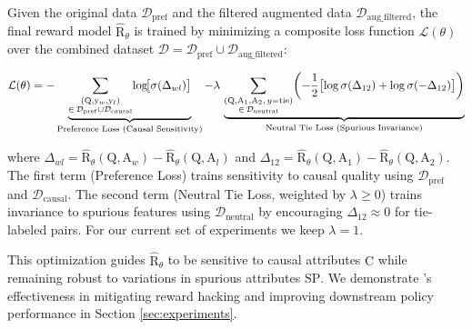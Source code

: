 Given the original data $\mathcal{D}_{\mathrm{pref}}$ and the filtered augmented data $\mathcal{D}_{\mathrm{aug\_filtered}}$, the final \carma{} reward model $\hat{\mathrm{R}}_\theta$ is trained by minimizing a composite loss function $\mathcal{L}(\theta)$ over the combined dataset $\mathcal{D} = \mathcal{D}_{\mathrm{pref}} \cup \mathcal{D}_{\mathrm{aug\_filtered}}$:


\begin{equation}
\mathcal{L}(\theta)=
-\underbrace{%
  \sum_{\substack{(\mathrm{Q},\mathrm{y}_w,\mathrm{y}_l)\\
                 \in\,\mathcal{D}_{\mathrm{pref}}\cup\mathcal{D}_{\mathrm{causal}}}}
  \!\log\!\bigl[\sigmoid(\Delta_{wl})\bigr]}_{\text{Preference Loss (Causal Sensitivity)}}
-\lambda\,\underbrace{%
  \sum_{\substack{(\mathrm{Q},\mathrm{A}_1,\mathrm{A}_2,\,y=\text{tie})\\
                 \in\,\mathcal{D}_{\mathrm{neutral}}}}
  \!\left(-\frac{1}{2}\bigl[\log\sigmoid(\Delta_{12})+\log\sigmoid(-\Delta_{12})\bigr]\right)}_{\text{Neutral Tie Loss (Spurious Invariance)}}
\label{eq:combined_loss_methodology}
\end{equation}


where $\Delta_{wl} = \hat{\mathrm{R}}_\theta(\mathrm{Q}, \mathrm{A}_w) - \hat{\mathrm{R}}_\theta(\mathrm{Q}, \mathrm{A}_l)$ and $\Delta_{12} = \hat{\mathrm{R}}_\theta(\mathrm{Q}, \mathrm{A}_1) - \hat{\mathrm{R}}_\theta(\mathrm{Q}, \mathrm{A}_2)$. The first term (Preference Loss) trains sensitivity to causal quality using $\mathcal{D}_{\mathrm{pref}}$ and $\mathcal{D}_{\mathrm{causal}}$. The second term (Neutral Tie Loss, weighted by $\lambda \ge 0$) trains invariance to spurious features using $\mathcal{D}_{\mathrm{neutral}}$ by encouraging $\Delta_{12} \approx 0$ for tie-labeled pairs. For our current set of experiments we keep $\lambda = 1$.

This optimization guides $\hat{\mathrm{R}}_\theta$ to be sensitive to causal attributes $\mathrm{C}$ while remaining robust to variations in spurious attributes $\mathrm{SP}$. We demonstrate \carma{}'s effectiveness in mitigating reward hacking and improving downstream policy performance in Section \ref{sec:experiments}.